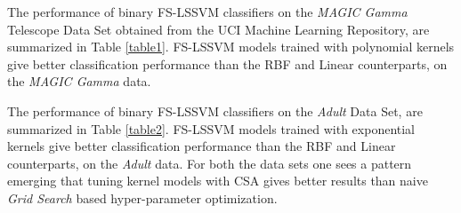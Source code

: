 


The performance of binary FS-LSSVM classifiers on the \textit{MAGIC Gamma} Telescope Data Set obtained from the UCI Machine Learning Repository, are summarized in Table \ref{table1}. FS-LSSVM models trained with polynomial kernels give better classification performance than the RBF and Linear counterparts, on the \textit{MAGIC Gamma} data.

\begin{table*}[!htbp]
\caption{Magic Gamma Test Results}
\begin{center}
\end{center}
\end{table*}

The performance of binary FS-LSSVM classifiers on the \textit{Adult} Data Set, are summarized in Table \ref{table2}. FS-LSSVM models trained with exponential kernels give better classification performance than the RBF and Linear counterparts, on the \textit{Adult} data. For both the data sets one sees a pattern emerging that tuning kernel models with CSA gives better results than naive \textit{Grid Search} based hyper-parameter optimization.

